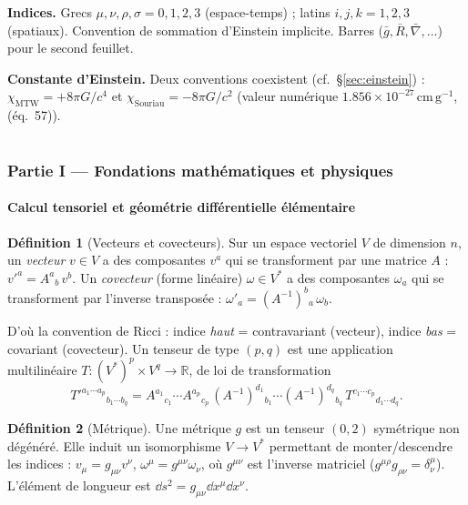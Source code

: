 \documentclass[11pt,a4paper]{article}
\theoremstyle{definition}
\newtheorem{definition}{Définition}[section]
\theoremstyle{plain}
\newcommand{\gbar}{\bar{g}}
\newcommand{\Rbar}{\bar{R}}
\newcommand{\nablabar}{\bar{\nabla}}
\newcommand{\eqpaper}[1]{\textsf{(éq.~#1)}}   %
\begin{document}
\textbf{Indices.} Grecs $\mu,\nu,\rho,\sigma=0,1,2,3$ (espace-temps) ; latins $i,j,k=1,2,3$
(spatiaux). Convention de sommation d'Einstein implicite. Barres ($\gbar,\Rbar,\nablabar,\dots$)
pour le second feuillet.

\textbf{Constante d'Einstein.} Deux conventions coexistent (cf.~\S\ref{sec:einstein}) :
$\chi_{\text{MTW}}=+8\pi G/c^4$ et $\chi_{\text{Souriau}}=-8\pi G/c^2$
(valeur numérique $1.856\times10^{-27}\,\mathrm{cm\,g^{-1}}$, \eqpaper{57}).

\part*{}
\section{Partie I — Fondations mathématiques et physiques}
\label{part:fond}

\subsection{Calcul tensoriel et géométrie différentielle élémentaire}

\begin{definition}[Vecteurs et covecteurs]
Sur un espace vectoriel $V$ de dimension $n$, un \emph{vecteur} $v\in V$ a des composantes
$v^a$ qui se transforment par une matrice $A$ : $v'^a=A^a{}_b\,v^b$. Un \emph{covecteur}
(forme linéaire) $\omega\in V^\ast$ a des composantes $\omega_a$ qui se transforment par
l'inverse transposée : $\omega'_a=(A^{-1})^b{}_a\,\omega_b$.
\end{definition}

D'où la convention de Ricci : indice \emph{haut} = contravariant (vecteur),
indice \emph{bas} = covariant (covecteur). Un tenseur de type $(p,q)$ est une application
multilinéaire $T:(V^\ast)^p\times V^q\to\mathbb R$, de loi de transformation
\begin{equation}
T'^{a_1\cdots a_p}{}_{b_1\cdots b_q}
= A^{a_1}{}_{c_1}\!\cdots A^{a_p}{}_{c_p}\,
(A^{-1})^{d_1}{}_{b_1}\!\cdots (A^{-1})^{d_q}{}_{b_q}\,
T^{c_1\cdots c_p}{}_{d_1\cdots d_q}.
\end{equation}

\begin{definition}[Métrique]
Une métrique $g$ est un tenseur $(0,2)$ symétrique non dégénéré. Elle induit un isomorphisme
$V\!\to\!V^\ast$ permettant de monter/descendre les indices :
$v_\mu=g_{\mu\nu}v^\nu$, $\omega^\mu=g^{\mu\nu}\omega_\nu$, où $g^{\mu\nu}$ est l'inverse
matriciel ($g^{\mu\rho}g_{\rho\nu}=\delta^\mu_\nu$). L'élément de longueur est
$\dd s^2=g_{\mu\nu}\dd x^\mu\dd x^\nu$.
\end{definition}
\end{document}
